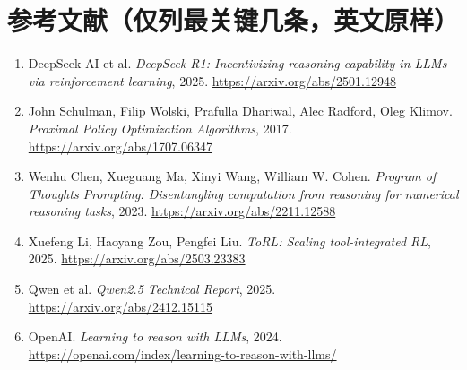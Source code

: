 \documentclass[11pt,UTF8,fontset=fandol]{ctexart}
\begin{document}
\section*{参考文献（仅列最关键几条，英文原样）}
\begin{enumerate}[leftmargin=2em,itemsep=1pt]
\item DeepSeek-AI et al. \emph{DeepSeek-R1: Incentivizing reasoning capability in LLMs via reinforcement learning}, 2025. \url{https://arxiv.org/abs/2501.12948}
\item John Schulman, Filip Wolski, Prafulla Dhariwal, Alec Radford, Oleg Klimov. \emph{Proximal Policy Optimization Algorithms}, 2017. \url{https://arxiv.org/abs/1707.06347}
\item Wenhu Chen, Xueguang Ma, Xinyi Wang, William W. Cohen. \emph{Program of Thoughts Prompting: Disentangling computation from reasoning for numerical reasoning tasks}, 2023. \url{https://arxiv.org/abs/2211.12588}
\item Xuefeng Li, Haoyang Zou, Pengfei Liu. \emph{ToRL: Scaling tool-integrated RL}, 2025. \url{https://arxiv.org/abs/2503.23383}
\item Qwen et al. \emph{Qwen2.5 Technical Report}, 2025. \url{https://arxiv.org/abs/2412.15115}
\item OpenAI. \emph{Learning to reason with LLMs}, 2024. \url{https://openai.com/index/learning-to-reason-with-llms/}
\end{enumerate}
\end{document}
